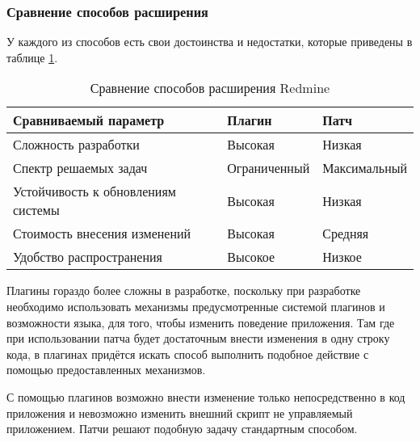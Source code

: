 \subsubsection{Сравнение способов расширения}
У каждого из способов есть свои достоинства и недостатки, которые приведены в
таблице \ref{comparing_extensions}.
\begin{table}[hb!]

\makeatletter
\def\@makecaption#1#2{
  \vskip\abovecaptionskip
  \sbox\@tempboxa{#2 #1}
  \begin{flushright}
    #1
  \end{flushright}
  \begin{center}
    \textbf{#2}
  \end{center}
  \vskip\belowcaptionskip}
\makeatother

\caption{Сравнение способов расширения Redmine}
\small
\centering
\begin{tabular}{ 
|>{\centering\arraybackslash}m{}
|>{\centering\arraybackslash}m{}
|>{\centering\arraybackslash}m{}|}
\hline
\textbf{Сравниваемый параметр} & \textbf{Плагин} & \textbf{Патч}\\
\hline
Сложность разработки & Высокая & Низкая \\
\hline
Спектр решаемых задач & Ограниченный & Максимальный\\
\hline
Устойчивость к обновлениям системы & Высокая & Низкая \\
\hline
Стоимость внесения изменений & Высокая & Средняя \\
\hline
Удобство распространения & Высокое & Низкое \\
\hline
\end{tabular}

\label{comparing_extensions}
\end{table}

Плагины гораздо более сложны в разработке, поскольку при разработке необходимо
использовать механизмы предусмотренные системой плагинов и возможности языка,
для того, чтобы изменить поведение приложения. Там где при
использовании патча будет достаточным внести изменения в одну строку кода, в
плагинах придётся искать способ выполнить подобное действие с помощью
предоставленных механизмов.

С помощью плагинов возможно внести изменение только непосредственно в код
приложения и невозможно изменить внешний скрипт не управляемый приложением.
Патчи решают подобную задачу стандартным способом.

